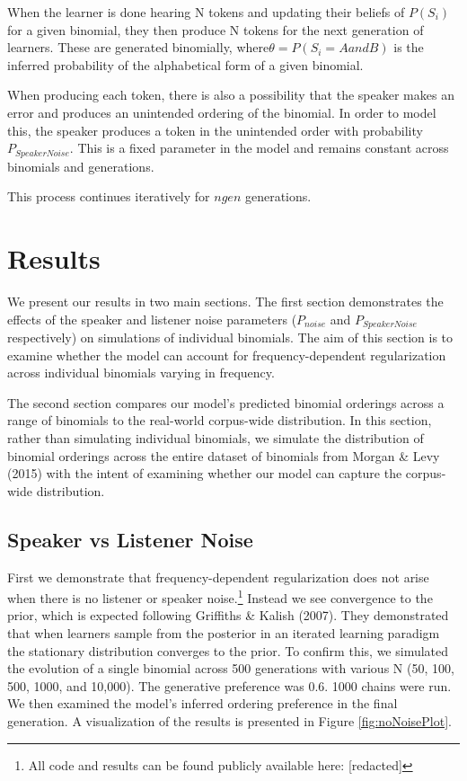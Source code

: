\documentclass[10pt, letterpaper]{article}
\begin{document}
When the learner is done hearing N tokens and updating their beliefs of
\(P(S_i)\) for a given binomial, they then produce N tokens for the next
generation of learners. These are generated binomially,
where\(\theta = P(S_i=AandB)\) is the inferred probability of the
alphabetical form of a given binomial.

When producing each token, there is also a possibility that the speaker
makes an error and produces an unintended ordering of the binomial. In
order to model this, the speaker produces a token in the unintended
order with probability \(P_{SpeakerNoise}\). This is a fixed parameter
in the model and remains constant across binomials and generations.

This process continues iteratively for \(ngen\) generations.

\hypertarget{results}{%
\section{Results}\label{results}}

We present our results in two main sections. The first section
demonstrates the effects of the speaker and listener noise parameters
(\(P_{noise}\) and \(P_{SpeakerNoise}\) respectively) on simulations of
individual binomials. The aim of this section is to examine whether the
model can account for frequency-dependent regularization across
individual binomials varying in frequency.

The second section compares our model's predicted binomial orderings
across a range of binomials to the real-world corpus-wide distribution.
In this section, rather than simulating individual binomials, we
simulate the distribution of binomial orderings across the entire
dataset of binomials from Morgan \& Levy (2015) with the intent of
examining whether our model can capture the corpus-wide distribution.

\hypertarget{speaker-vs-listener-noise}{%
\subsection{Speaker vs Listener Noise}\label{speaker-vs-listener-noise}}

First we demonstrate that frequency-dependent regularization does not
arise when there is no listener or speaker noise.\footnote{All code and
  results can be found publicly available here: {[}redacted{]}} Instead
we see convergence to the prior, which is expected following Griffiths
\& Kalish (2007). They demonstrated that when learners sample from the
posterior in an iterated learning paradigm the stationary distribution
converges to the prior. To confirm this, we simulated the evolution of a
single binomial across 500 generations with various N (50, 100, 500,
1000, and 10,000). The generative preference was 0.6. 1000 chains were
run. We then examined the model's inferred ordering preference in the
final generation. A visualization of the results is presented in Figure
\ref{fig:noNoisePlot}.
\end{document}
